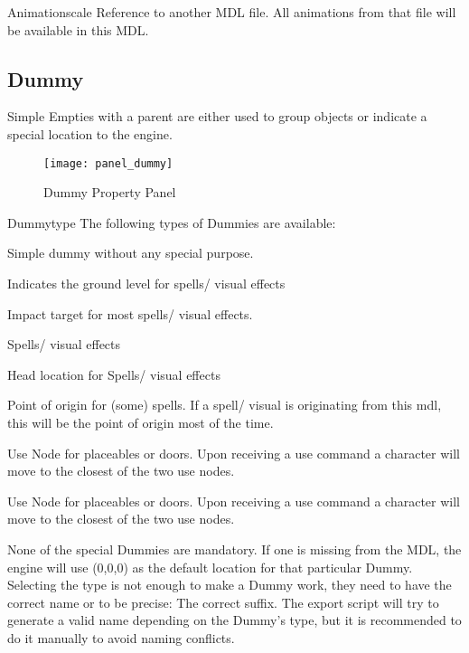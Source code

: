 \begin{propertyAurora}{Animationscale}
Reference to another MDL file. All animations from that file 
will be available in this MDL.
\end{propertyAurora}

\subsection{Dummy}
Simple Empties with a parent are either used to group objects or
indicate a special location to the engine. \\

\begin{figure}
  \centering
  \texttt{[image: panel\_dummy]}
  \caption[panel dummy]{Dummy Property Panel}
  \label{fig:panel_dummy}
\end{figure}

\begin{propertyAurora}{Dummytype}
The following types of Dummies are available:
\begin{description}[leftmargin=6em,style=nextline]
    \item[None] Simple dummy without any special purpose.
    \item[Ground] Indicates the ground level for spells/ visual effects
    \item[Impact] Impact target for most spells/ visual effects.
    \item[Head Hit] Spells/ visual effects
    \item[Head] Head location for Spells/ visual effects
    \item[Hand] Point of origin for (some) spells. If a spell/ visual is originating from this mdl, this will be the point of origin most of the time.
    \item[Use 1] Use Node for placeables or doors. Upon receiving a use command a character will move to the closest of the two use nodes.
    \item[Use 2] Use Node for placeables or doors. Upon receiving a use command a character will move to the closest of the two use nodes.
\end{description}
\end{propertyAurora}
None of the special Dummies are mandatory. If one is
missing from the MDL, the engine will use (0,0,0) as the default location
for that particular Dummy. \\

Selecting the type is not enough to make a Dummy work, they need to have
the correct name or to be precise: The correct suffix.
The export script will try to generate a valid name depending on
the Dummy's type, but it is recommended to do it manually to avoid naming
conflicts. \\

